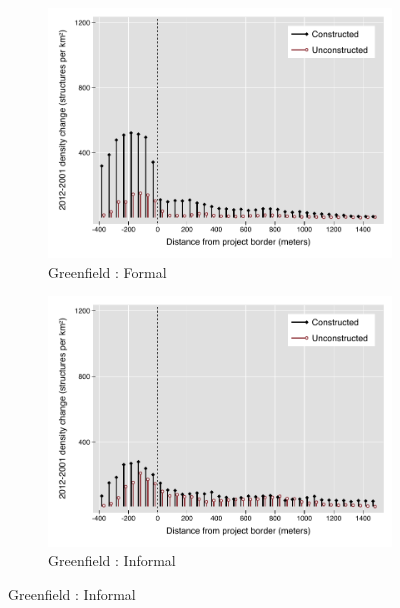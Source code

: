 \documentclass[12pt]{article}
\begin{document}
\begin{figure}
        \begin{subfigure}[b]{0.495\textwidth}
            \centering
        \caption{Greenfield : Formal}
            \includegraphics[width=\textwidth,trim={0.3cm .3cm 0.1cm 0cm}, clip=true]{figures/bblu_for_rawchanges_4_1}
        \end{subfigure}
        \hfill
        \begin{subfigure}[b]{0.495\textwidth}  
            \centering 
        \caption{Greenfield : Informal}
            \includegraphics[width=\textwidth,trim={0.3cm .3cm 0.1cm 0cm}, clip=true]{figures/bblu_inf_rawchanges_4_1.pdf}
        \end{subfigure}

\end{figure}
\end{document}
